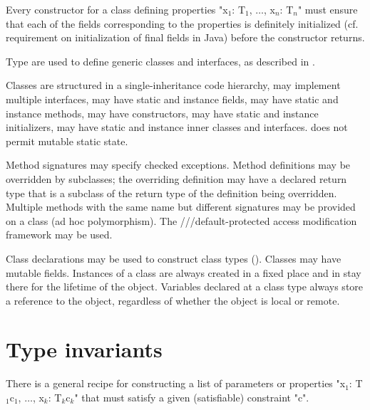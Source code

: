 \begin{staticrule*}
     Every constructor for a class defining
   properties \xcdmath"x$_1$: T$_1$, $\ldots$, x$_n$: T$_n$" must ensure that each of the fields
   corresponding to the properties is definitely initialized
   (cf. requirement on initialization of final fields in Java) before the
   constructor returns.
\end{staticrule*}

Type \params{} are used to define generic classes and
interfaces, as described in .

Classes are structured in a single-inheritance code
hierarchy, may implement multiple interfaces, may have static and
instance fields, may have static and instance methods, may have
constructors, may have static and instance initializers, may have
static and instance inner classes and interfaces. \Xten{} does not
permit mutable static state.

Method signatures may specify checked exceptions. Method definitions
may be overridden by subclasses; the overriding definition may have a
declared return type that is a subclass of the return type of the
definition being overridden. Multiple methods with the same name but
different signatures may be provided on a class (ad hoc
polymorphism). The ///default-protected access
modification framework may be used.



\label{ReferenceClasses}

Class declarations may
be used to construct class types (). Classes may
have mutable fields. Instances of a class are always created in a
fixed place and in \XtenCurrVer{} stay there for the lifetime of the
object.  Variables declared at a class type always store a reference
to the object, regardless of whether the object is local or remote.


\section{Type invariants}\label{DepType:ClassGuard}

There is a general recipe for constructing a list of parameters or
properties \xcdmath"x$_1$: T$_1${c$_1$}, $\dots$, x$_k$: T$_k${c$_k$}" that must satisfy a given
(satisfiable) constraint \xcd"c". 

